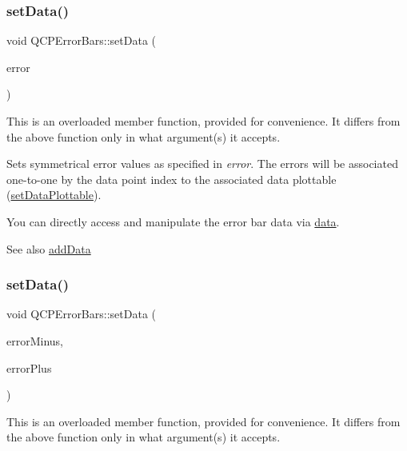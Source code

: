 \subsubsection{\texorpdfstring{setData()}{setData()}\hspace{0.1cm}{\footnotesize\ttfamily [2/3]}}
{\footnotesize\ttfamily void Q\+C\+P\+Error\+Bars\+::set\+Data (\begin{DoxyParamCaption}\item[{const Q\+Vector$<$ double $>$ \&}]{error }\end{DoxyParamCaption})}

This is an overloaded member function, provided for convenience. It differs from the above function only in what argument(s) it accepts.

Sets symmetrical error values as specified in {\itshape error}. The errors will be associated one-\/to-\/one by the data point index to the associated data plottable (\mbox{\hyperlink{class_q_c_p_error_bars_aabb42a964cfbf780cd1c79850c7cd989}{set\+Data\+Plottable}}).

You can directly access and manipulate the error bar data via \mbox{\hyperlink{class_q_c_p_error_bars_aeebd1b14f4c3573565efafd514988813}{data}}.

\begin{DoxySeeAlso}{See also}
\mbox{\hyperlink{class_q_c_p_error_bars_aae296ad9817b3fa418db284af81cecf8}{add\+Data}} 
\end{DoxySeeAlso}
\mbox{\label{class_q_c_p_error_bars_aac0cf070b957c11177e91b02bcb433c8}} 
\subsubsection{\texorpdfstring{setData()}{setData()}\hspace{0.1cm}{\footnotesize\ttfamily [3/3]}}
{\footnotesize\ttfamily void Q\+C\+P\+Error\+Bars\+::set\+Data (\begin{DoxyParamCaption}\item[{const Q\+Vector$<$ double $>$ \&}]{error\+Minus,  }\item[{const Q\+Vector$<$ double $>$ \&}]{error\+Plus }\end{DoxyParamCaption})}

This is an overloaded member function, provided for convenience. It differs from the above function only in what argument(s) it accepts.

